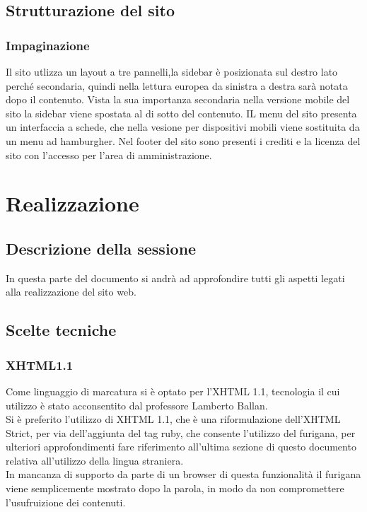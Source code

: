 \documentclass[openany, a4paper, 12pt]{report}
\begin{document}
	\section{Strutturazione del sito}
	\subsection{Impaginazione}
	Il sito utlizza un layout a tre pannelli,la sidebar è posizionata sul destro lato perché secondaria, quindi nella lettura europea da sinistra a destra sarà notata dopo il contenuto. Vista la sua importanza secondaria nella versione mobile del sito la sidebar viene spostata al di sotto del contenuto. IL menu del sito presenta un interfaccia a schede, che nella vesione per dispositivi mobili viene sostituita da un menu ad hamburgher. Nel footer del sito sono presenti i crediti e la licenza del sito con l'accesso per l'area di amministrazione.
	
	
	\chapter{Realizzazione}
	\section{Descrizione della sessione}
	In questa parte del documento si andrà ad approfondire tutti gli aspetti legati alla realizzazione del sito web.
	
	\section{Scelte tecniche}
	\subsection{XHTML1.1}
	Come linguaggio di marcatura si è optato per l'XHTML 1.1, tecnologia il cui utilizzo è stato acconsentito dal professore Lamberto Ballan.\\
	Si è preferito l'utilizzo di XHTML 1.1, che è una riformulazione dell'XHTML Strict, per via dell'aggiunta del tag ruby, che consente l'utilizzo del furigana, per ulteriori approfondimenti fare riferimento all'ultima sezione di questo documento relativa all'utilizzo della lingua straniera.\\
	In mancanza di supporto da parte di un browser di questa funzionalità il furigana viene semplicemente mostrato dopo la parola, in modo da non compromettere l'usufruizione dei contenuti.
	
\end{document}
